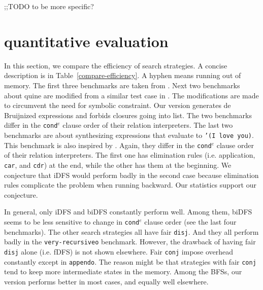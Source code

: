 \documentclass[format=acmlarge, review=true, authordraft=true]{acmart}
\newcommand{\conde}{\texttt{cond$^e$} }
\newcommand{\conj}{\texttt{conj}}
\newcommand{\disj}{\texttt{disj}}
\begin{document}
;;TODO to be more specific?

\section{quantitative evaluation}

In this section, we compare the efficiency of search strategies. A concise description is in Table~\ref{compare-efficiency}. A hyphen means running out of memory. The first three benchmarks are taken from \citep{friedman_reasoned_2018}. Next two benchmarks about quine are modified from a similar test case in \citep{byrd2017unified}. The modifications are made to circumvent the need for symbolic constraint. Our version generates de Bruijnized expressions and forbids closures going into list. The two benchmarks differ in the \conde clause order of their relation interpreters. The last two benchmarks are about synthesizing expressions that evaluate to \texttt{'(I love you)}. This benchmark is also inspired by \citep{byrd2017unified}. Again, they differ in the \conde clause order of their relation interpreters. The first one has elimination rules (i.e. application, \texttt{car}, and \texttt{cdr}) at the end, while the other has them at the beginning. We conjecture that iDFS would perform badly in the second case because elimination rules complicate the problem when running backward. Our statistics support our conjecture.

In general, only iDFS and biDFS constantly perform well. Among them, biDFS seems to be less sensitive to change in \conde clause order (see the last four benchmarks). The other search strategies all have fair \disj{}. And they all perform badly in the \texttt{very-recursiveo} benchmark. However, the drawback of having fair \disj{} alone (i.e. fDFS) is not shown elsewhere. Fair \conj{} impose overhead constantly except in \texttt{appendo}. The reason might be that strategies with fair \conj{} tend to keep more intermediate states in the memory. Among the BFSs, our version performs better in most cases, and equally well elsewhere. 
\end{document}
